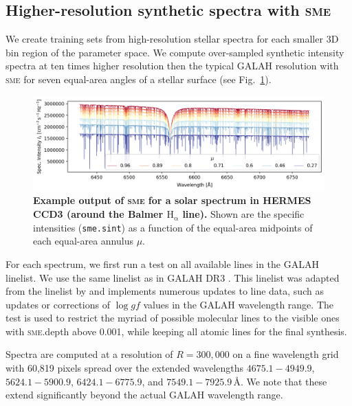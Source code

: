 \documentclass[
  journal=pasa,
  manuscript=research-paper, %
  year=2024,
  volume=37
]{cup-journal}
\newcommand{\sme}{\textsc{sme}\xspace}
\newcommand{\Angstroem}{\,\text{\AA}}	%
\begin{document}
\subsection{Higher-resolution synthetic spectra with \sme}
\label{sec:higher_resolution_synthetic_spectra}

We create training sets from high-resolution stellar spectra for each smaller 3D bin region of the parameter space. We compute over-sampled synthetic intensity spectra at ten times higher resolution then the typical GALAH resolution with \sme for seven equal-area angles of a stellar surface (see Fig.~\ref{fig:sme_mu_output}).

\begin{figure}[hbt]
 \centering
 \includegraphics[width=\textwidth]{figures/solar_twin_specific_intensity.png}
 \caption{\textbf{Example output of \sme for a solar spectrum in HERMES CCD3 (around the Balmer $\mathrm{H}_\upalpha$ line).} Shown are the specific intensities (\texttt{sme.sint}) as a function of the equal-area midpoints of each equal-area annulus $\mu$.}
 \label{fig:sme_mu_output}
\end{figure}

For each spectrum, we first run a test on all available lines in the GALAH linelist. We use the same linelist as in GALAH DR3 \citep{Buder2021}. This linelist was adapted from the linelist by \citet{Heiter2021} and implements numerous updates to line data, such as updates or corrections of $\log gf$ values in the GALAH wavelength range. The test is used to restrict the myriad of possible molecular lines to the visible ones with \textsc{sme}.depth above 0.001, while keeping all atomic lines for the final synthesis.

Spectra are computed at a resolution of $R = 300,000$ on a fine wavelength grid with 60,819 pixels spread over the extended wavelengths $4675.1-4949.9$, $5624.1-5900.9$, $6424.1-6775.9$, and $7549.1-7925.9 \Angstroem$. We note that these extend significantly beyond the actual GALAH wavelength range.
\end{document}
